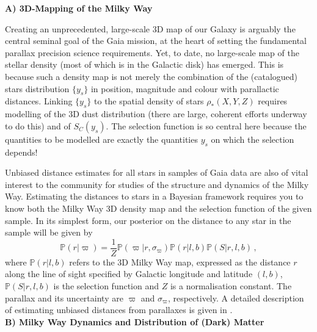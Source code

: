 \noindent\textbf{A) 3D-Mapping of the Milky Way}

Creating an unprecedented, large-scale 3D map of our Galaxy is arguably the central seminal goal of the Gaia mission, at the heart of setting the fundamental parallax precision science requirements. Yet, to date, no large-scale map of the stellar density (most of which is in the Galactic disk) has emerged. This is because  such a density map is not merely the combination of the (catalogued) stars distribution $\{y_s\}$ in position, magnitude and colour with parallactic distances. Linking $\{y_s\}$ to the spatial density of stars $\rho_*(X,Y,Z)$ requires modelling of the 3D dust distribution (there are large, coherent efforts underway to do this) and of $S_C(y_s)$. The selection function is so central here because the quantities to be modelled are exactly the quantities $y_s$ on which the selection depends!

Unbiased distance estimates for all stars in samples of Gaia data are also of vital interest to the community for studies of the structure and dynamics of the Milky Way. Estimating the distances to stars in a Bayesian framework requires you to know both the Milky Way 3D density map and the selection function of the given sample. In its simplest form, our posterior on the distance to any star in the sample will be given by
\begin{equation}
    \mathbb{P}(r | \varpi) = \frac{1}{Z} \mathbb{P}(\varpi | r, \sigma_\varpi) \mathbb{P}(r | l, b) \mathbb{P}(S | r, l, b)\,,
\end{equation}
where $\mathbb{P}(r | l, b)$ refers to the 3D Milky Way map, expressed as the distance $r$ along the line of sight specified by Galactic longitude and latitude $(l,b)$, $\mathbb{P}(S | r, l, b)$ is the selection function and $Z$ is a normalisation constant. The parallax and its uncertainty are $\varpi$ and $\sigma_\varpi$, respectively. A detailed description of estimating unbiased distances from parallaxes is given in \citet{2018A&A...616A...9L}.
\\

\noindent\textbf{B) Milky Way Dynamics and Distribution of (Dark) Matter}

